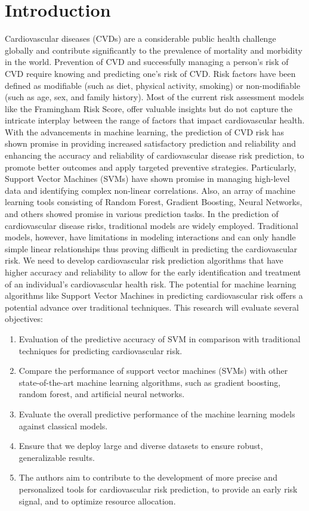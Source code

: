 \documentclass[conference]{IEEEtran}
\begin{document}
\section{Introduction}
Cardiovascular diseases (CVDs) are a considerable public health challenge globally and contribute significantly to the prevalence of mortality and morbidity in the world. Prevention of CVD and successfully managing a person's risk of CVD require knowing and predicting one's risk of CVD. Risk factors have been defined as modifiable (such as diet, physical activity, smoking) or non-modifiable (such as age, sex, and family history). Most of the current risk assessment models like the Framingham Risk Score, offer valuable insights but do not capture the intricate interplay between the range of factors that impact cardiovascular health. With the advancements in machine learning, the prediction of CVD risk has shown promise in providing increased satisfactory prediction and reliability and enhancing the accuracy and reliability of cardiovascular disease risk prediction, to promote better outcomes and apply targeted preventive strategies. Particularly, Support Vector Machines (SVMs) have shown promise in managing high-level data and identifying complex non-linear correlations. Also, an array of machine learning tools consisting of Random Forest, Gradient Boosting, Neural Networks, and others showed promise in various prediction tasks. In the prediction of cardiovascular disease risks, traditional models are widely employed. Traditional models, however, have limitations in modeling interactions and can only handle simple linear relationships thus proving difficult in predicting the cardiovascular risk. We need to develop cardiovascular risk prediction algorithms that have higher accuracy and reliability to allow for the early identification and treatment of an individual’s cardiovascular health risk. The potential for machine learning algorithms like Support Vector Machines in predicting cardiovascular risk offers a potential advance over traditional techniques. This research will evaluate several objectives:
\begin{enumerate}
    \item Evaluation of the predictive accuracy of SVM in comparison with traditional techniques for predicting cardiovascular risk.
    \item Compare the performance of support vector machines (SVMs) with other state-of-the-art machine learning algorithms, such as gradient boosting, random forest, and artificial neural networks.
    \item Evaluate the overall predictive performance of the machine learning models against classical models.
    \item Ensure that we deploy large and diverse datasets to ensure robust, generalizable results.
    \item The authors aim to contribute to the development of more precise and personalized tools for cardiovascular risk prediction, to provide an early risk signal, and to optimize resource allocation.
\end{enumerate}
\end{document}
